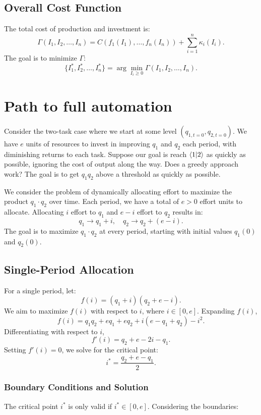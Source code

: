 \documentclass{article}
\begin{document}
\subsection{Overall Cost Function}
The total cost of production and investment is:
\[
    \Gamma(I_1, I_2, \dots, I_n) = C(f_1(I_1), \dots, f_n(I_n)) + \sum_{i=1}^n \kappa_i(I_i).
\]
The goal is to minimize $\Gamma$:
\[
    \{I_1^*, I_2^*, \dots, I_n^*\} = \arg\min_{I_i \geq 0} \Gamma(I_1, I_2, \dots, I_n).
\]

\section{Path to full automation}
Consider the two-task case where we start at some level $(q_{1, t = 0}, q_{2, t = 0})$.
We have $e$ units of resources to invest in improving $q_1$ and $q_2$ each period, with diminishing returns to each task.
Suppose our goal is reach $\langle 1 | 2 \rangle$ as quickly as possible, ignoring the cost of output along the way.
Does a greedy approach work? 
The goal is to get $q_1 q_2$ above a threshold as quickly as possible.

We consider the problem of dynamically allocating effort to maximize the product \( q_1 \cdot q_2 \) over time. 
Each period, we have a total of \( e > 0 \) effort units to allocate. 
Allocating \( i \) effort to \( q_1 \) and \( e - i \) effort to \( q_2 \) results in:
\[
q_1 \to q_1 + i, \quad q_2 \to q_2 + (e - i).
\]
The goal is to maximize \( q_1 \cdot q_2 \) at every period, starting with initial values \( q_1(0) \) and \( q_2(0) \).

\subsection{Single-Period Allocation}

For a single period, let:
\[
f(i) = (q_1 + i)(q_2 + e - i).
\]
We aim to maximize \( f(i) \) with respect to \( i \), where \( i \in [0, e] \). Expanding \( f(i) \),
\[
f(i) = q_1 q_2 + e q_1 + e q_2 + i(e - q_1 + q_2) - i^2.
\]
Differentiating with respect to \( i \),
\[
f'(i) = q_2 + e - 2i - q_1.
\]
Setting \( f'(i) = 0 \), we solve for the critical point:
\[
i^* = \frac{q_2 + e - q_1}{2}.
\]

\subsubsection*{Boundary Conditions and Solution}

The critical point \( i^* \) is only valid if \( i^* \in [0, e] \). Considering the boundaries:
\end{document}
